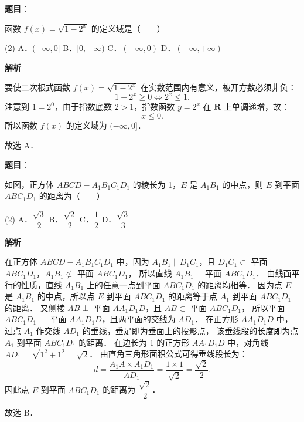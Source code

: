\begin{answer}

\textbf{题目}：

函数 $f(x) = \sqrt{1 - 2^x}$ 的定义域是\mbox{（　　）}

\begin{gkopts}(2)
\task A．$(-\infty, 0]$
\task B．$[0, +\infty)$
\task C．$(-\infty, 0)$
\task D．$(-\infty, +\infty)$
\end{gkopts}

\textbf{解析}

要使二次根式函数 $f(x) = \sqrt{1 - 2^x}$ 在实数范围内有意义，被开方数必须非负：
\nopagebreak[4]
\[
1 - 2^x \geqslant 0 \iff 2^x \leqslant 1.
\]
注意到 $1 = 2^0$，由于指数底数 $2 > 1$，指数函数 $y = 2^x$ 在 $\mathbf{R}$ 上单调递增，故：
\nopagebreak[4]
\[
x \leqslant 0.
\]
所以函数 $f(x)$ 的定义域为 $(-\infty, 0]$．

故选 A．


\end{answer}
\begin{answer}

\textbf{题目}：

如图，正方体 $ABCD - A_1B_1C_1D_1$ 的棱长为 1，$E$ 是 $A_1B_1$ 的中点，则 $E$ 到平面 $ABC_1D_1$ 的距离为\mbox{（　　）}
\nopagebreak[4]
\begin{center}\end{center}
\nopagebreak[4]
\begin{gkopts}(2)
\task A．$\dfrac{\sqrt{3}}{2}$
\task B．$\dfrac{\sqrt{2}}{2}$
\task C．$\dfrac{1}{2}$
\task D．$\dfrac{\sqrt{3}}{3}$
\end{gkopts}

\textbf{解析}

在正方体 $ABCD - A_1B_1C_1D_1$ 中，因为 $A_1B_1 \parallel D_1C_1$，且 $D_1C_1 \subset$ 平面 $ABC_1D_1$，$A_1B_1 \not\subset$ 平面 $ABC_1D_1$，
所以直线 $A_1B_1 \parallel$ 平面 $ABC_1D_1$．
由线面平行的性质，直线 $A_1B_1$ 上的任意一点到平面 $ABC_1D_1$ 的距离均相等．
因为点 $E$ 是 $A_1B_1$ 的中点，所以点 $E$ 到平面 $ABC_1D_1$ 的距离等于点 $A_1$ 到平面 $ABC_1D_1$ 的距离．
又侧棱 $AB \perp$ 平面 $AA_1D_1D$，且 $AB \subset$ 平面 $ABC_1D_1$，
所以平面 $ABC_1D_1 \perp$ 平面 $AA_1D_1D$，且两平面的交线为 $AD_1$．
在正方形 $AA_1D_1D$ 中，过点 $A_1$ 作交线 $AD_1$ 的垂线，垂足即为垂面上的投影点，
该垂线段的长度即为点 $A_1$ 到平面 $ABC_1D_1$ 的距离．
在边长为 1 的正方形 $AA_1D_1D$ 中，对角线 $AD_1 = \sqrt{1^2 + 1^2} = \sqrt{2}$．
由直角三角形面积公式可得垂线段长为：
\nopagebreak[4]
\[
d = \frac{A_1A \times A_1D_1}{AD_1} = \frac{1 \times 1}{\sqrt{2}} = \frac{\sqrt{2}}{2}.
\]
因此点 $E$ 到平面 $ABC_1D_1$ 的距离为 $\dfrac{\sqrt{2}}{2}$．

故选 B．


\end{answer}
